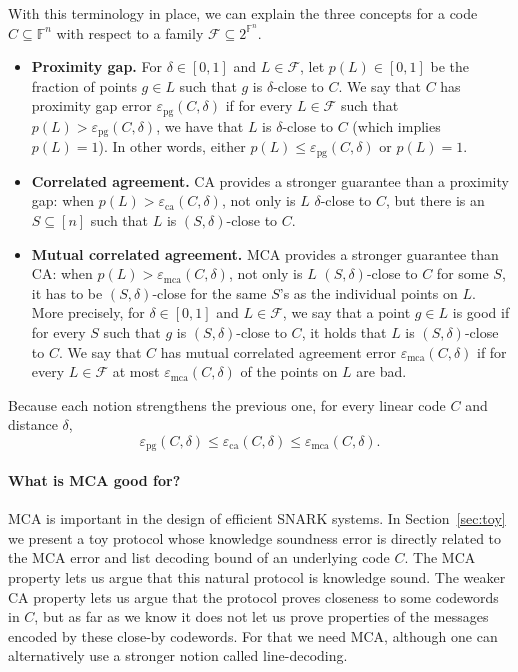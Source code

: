 \documentclass[11pt]{article}
\theoremstyle{plain}
\theoremstyle{definition}
\newcommand{\F}{\mathbb{F}}
\newcommand{\calF}{\mathcal{F}}
\newcommand{\epspg}{\varepsilon_{\mathrm{pg}}}
\newcommand{\epsca}{\varepsilon_{\mathrm{ca}}}
\newcommand{\epsmca}{\varepsilon_{\mathrm{mca}}}
\begin{document}
With this terminology in place, we can explain the three concepts for a code $C\subseteq\F^n$ with respect to a family $\calF\subseteq 2^{\F^n}$.

\begin{itemize}
  \item \textbf{Proximity gap.} For $\delta\in[0,1]$ and $L\in\calF$, let $p(L)\in[0,1]$ be the fraction of points $g\in L$ such that $g$ is $\delta$-close to $C$. We say that $C$ has proximity gap error $\epspg(C,\delta)$ if for every $L\in\calF$ such that $p(L)>\epspg(C,\delta)$, we have that $L$ is $\delta$-close to $C$ (which implies $p(L)=1$). In other words, either $p(L)\le \epspg(C,\delta)$ or $p(L)=1$.

  \item \textbf{Correlated agreement.} CA provides a stronger guarantee than a proximity gap: when $p(L)>\epsca(C,\delta)$, not only is $L$ $\delta$-close to $C$, but there is an $S\subseteq[n]$ such that $L$ is $(S,\delta)$-close to $C$.

  \item \textbf{Mutual correlated agreement.} MCA provides a stronger guarantee than CA: when $p(L)>\epsmca(C,\delta)$, not only is $L$ $(S,\delta)$-close to $C$ for some $S$, it has to be $(S,\delta)$-close for the same $S$'s as the individual points on $L$. More precisely, for $\delta\in[0,1]$ and $L\in\calF$, we say that a point $g\in L$ is good if for every $S$ such that $g$ is $(S,\delta)$-close to $C$, it holds that $L$ is $(S,\delta)$-close to $C$. We say that $C$ has mutual correlated agreement error $\epsmca(C,\delta)$ if for every $L\in\calF$ at most $\epsmca(C,\delta)$ of the points on $L$ are bad.
\end{itemize}
Because each notion strengthens the previous one, for every linear code $C$ and distance $\delta$,
\[
  \epspg(C,\delta) \le \epsca(C,\delta) \le \epsmca(C,\delta).
\]

\paragraph{What is MCA good for?}
MCA is important in the design of efficient SNARK systems. In Section~\ref{sec:toy} we present a toy protocol whose knowledge soundness error is directly related to the MCA error and list decoding bound of an underlying code $C$. The MCA property lets us argue that this natural protocol is knowledge sound. The weaker CA property lets us argue that the protocol proves closeness to some codewords in $C$, but as far as we know it does not let us prove properties of the messages encoded by these close-by codewords. For that we need MCA, although one can alternatively use a stronger notion called line-decoding.
\end{document}
